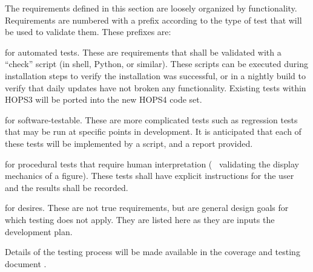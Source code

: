 The requirements defined in this section are loosely organized by functionality.
Requirements are numbered with a prefix according to
the type of test that will be used to validate them.  These prefixes are:
\begin{description}
[align=left, labelwidth=0.0cm, leftmargin=1cm]
\item[A,] for automated tests. These are requirements
that shall be validated with a ``check'' script (in shell, Python, or similar).
These scripts can be executed during installation steps to verify the
installation was successful,
or in a nightly build to verify that daily updates have not broken any
functionality. Existing tests within HOPS3 will be ported into the new
HOPS4 code set.

\item[S,] for software-testable. These are more complicated tests such as
regression tests that may be run at specific points in development. It is
anticipated that each of these tests will be implemented by a script, and a report provided.

\item[P,] for procedural tests that require human interpretation (\eg~
validating the display mechanics of a figure). These tests shall have
explicit instructions for the user and the results shall be recorded.

\item[D,] for desires. These are not true requirements, but are general
design goals for which testing does not apply.  They are listed here as
they are inputs the development plan.


\end{description}

Details of the testing process will be made available in the coverage
and testing document \cite{cover}.

